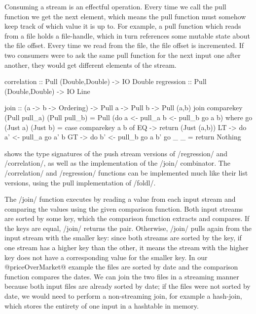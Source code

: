 Consuming a stream is an effectful operation.
Every time we call the pull function we get the next element, which means the pull function must somehow keep track of which value it is up to.
For example, a pull function which reads from a file holds a file-handle, which in turn references some mutable state about the file offset.
Every time we read from the file, the file offset is incremented.
If two consumers were to ask the same pull function for the next input one after another, they would get different elements of the stream.


\begin{haskell}[float,caption=Pull stream combinators,label=figs/impl/pull/combinator]
correlation :: Pull (Double,Double) -> IO Double
regression  :: Pull (Double,Double) -> IO Line

join        :: (a -> b -> Ordering) -> Pull a -> Pull b -> Pull (a,b)
join comparekey (Pull pull_a) (Pull pull_b) = Pull (do
   a <- pull_a
   b <- pull_b
   go a b)
 where
  go (Just a) (Just b)
   = case comparekey a b of
      EQ -> return (Just (a,b))
      LT -> do
        a' <- pull_a
        go a' b
      GT -> do
        b' <- pull_b
        go a b'
  go _ _ = return Nothing
\end{haskell}


 shows the type signatures of the push stream versions of \Hs/regression/ and \Hs/correlation/, as well as the implementation of the \Hs/join/ combinator.
The \Hs/correlation/ and \Hs/regression/ functions can be implemented much like their list versions, using the pull implementation of \Hs/foldl/.

The \Hs/join/ function executes by reading a value from each input stream and comparing the values using the given comparison function.
Both input streams are sorted by some key, which the comparison function extracts and compares.
If the keys are equal, \Hs/join/ returns the pair.
Otherwise, \Hs/join/ pulls again from the input stream with the smaller key: since both streams are sorted by the key, if one stream has a higher key than the other, it means the stream with the higher key does not have a corresponding value for the smaller key.
In our @priceOverMarket@ example the files are sorted by date and the comparison function compares the dates.
We can join the two files in a streaming manner because both input files are already sorted by date; if the files were not sorted by date, we would need to perform a non-streaming join, for example a hash-join, which stores the entirety of one input in a hashtable in memory.

